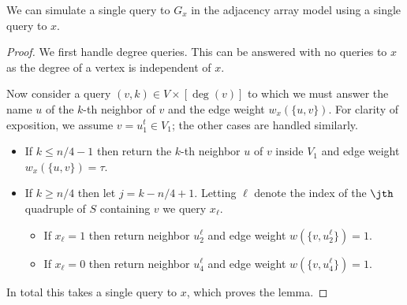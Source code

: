 \begin{lemma} \label{lem:adj-query}
We can simulate a single query to $G_x$ in the adjacency array model using a single query to $x$.
\end{lemma}
\begin{proof}
We first handle degree queries.  This can be answered with no queries to $x$ as the degree of a vertex is independent of $x$.

Now consider a query $(v,k) \in V \times [\deg(v)]$ to which we must answer the name $u$ of the $k$-th neighbor of 
$v$ and the edge weight $w_x(\{u,v\})$.  For clarity of exposition, we assume $v = u_1^t \in V_1$; the other cases are handled similarly.
\begin{itemize}
\item
If $k \leq n/4 - 1$ then return the $k$-th neighbor $u$ of $v$ inside $V_1$ and edge weight $w_x(\{u,v\}) = \tau$.
\item
If $k \ge n/4$ then let $j = k -n/4 +1$.  Letting $\ell$ denote the index of the $\jth$ quadruple of $S$ containing $v$ we query $x_\ell$.
\begin{itemize}
\item
If $x_\ell = 1$ then return neighbor $u^\ell_2$ and edge weight $w(\{v,u^\ell_2\}) = 1$.
\item
If $x_\ell = 0$ then return neighbor $u^\ell_4$ and edge weight $w(\{v,u^\ell_4\}) = 1$.
\end{itemize}
\end{itemize}
In total this takes a single query to $x$, which proves the lemma.
\end{proof}

